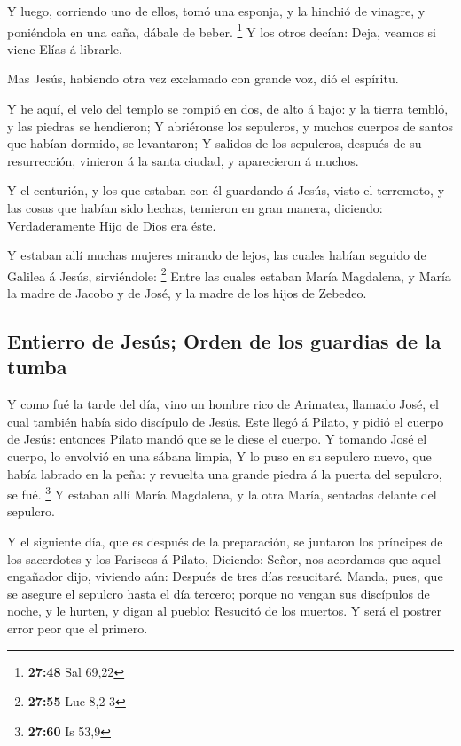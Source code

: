  Y luego, corriendo uno de ellos, tomó una esponja, y la
hinchió de vinagre, y poniéndola en una caña, dábale de beber.
\footnote{\textbf{27:48} Sal 69,22}  Y los otros decían:
Deja, veamos si viene Elías á librarle.

 Mas Jesús, habiendo otra vez exclamado con grande voz, dió
el espíritu.

 Y he aquí, el velo del templo se rompió en dos, de alto á
bajo: y la tierra tembló, y las piedras se hendieron;  Y
abriéronse los sepulcros, y muchos cuerpos de santos que habían dormido,
se levantaron;  Y salidos de los sepulcros, después de su
resurrección, vinieron á la santa ciudad, y aparecieron á muchos.

 Y el centurión, y los que estaban con él guardando á
Jesús, visto el terremoto, y las cosas que habían sido hechas, temieron
en gran manera, diciendo: Verdaderamente Hijo de Dios era éste.

 Y estaban allí muchas mujeres mirando de lejos, las cuales
habían seguido de Galilea á Jesús, sirviéndole: \footnote{\textbf{27:55}
  Luc 8,2-3}  Entre las cuales estaban María Magdalena, y
María la madre de Jacobo y de José, y la madre de los hijos de Zebedeo.

\hypertarget{entierro-de-jesuxfas-orden-de-los-guardias-de-la-tumba}{%
\subsection{Entierro de Jesús; Orden de los guardias de la
tumba}\label{entierro-de-jesuxfas-orden-de-los-guardias-de-la-tumba}}

 Y como fué la tarde del día, vino un hombre rico de
Arimatea, llamado José, el cual también había sido discípulo de Jesús.
 Este llegó á Pilato, y pidió el cuerpo de Jesús: entonces
Pilato mandó que se le diese el cuerpo.  Y tomando José el
cuerpo, lo envolvió en una sábana limpia,  Y lo puso en su
sepulcro nuevo, que había labrado en la peña: y revuelta una grande
piedra á la puerta del sepulcro, se fué. \footnote{\textbf{27:60} Is
  53,9}  Y estaban allí María Magdalena, y la otra María,
sentadas delante del sepulcro.

 Y el siguiente día, que es después de la preparación, se
juntaron los príncipes de los sacerdotes y los Fariseos á Pilato,
 Diciendo: Señor, nos acordamos que aquel engañador dijo,
viviendo aún: Después de tres días resucitaré.  Manda,
pues, que se asegure el sepulcro hasta el día tercero; porque no vengan
sus discípulos de noche, y le hurten, y digan al pueblo: Resucitó de los
muertos. Y será el postrer error peor que el primero.

